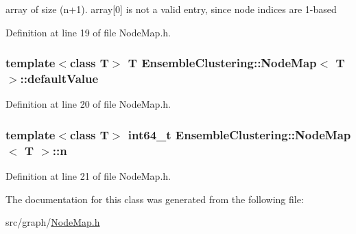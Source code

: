 array of size (n+1). array\mbox{[}0\mbox{]} is not a valid entry, since node indices are 1-\/based 



Definition at line 19 of file Node\-Map.\-h.

\hypertarget{class_ensemble_clustering_1_1_node_map_a79da6a77072605a77c060bbb2e5a620c}{
\subsubsection[{default\-Value}]{\setlength{\rightskip}{0pt plus 5cm}template$<$class T$>$ T {\bf Ensemble\-Clustering\-::\-Node\-Map}$<$ T $>$\-::default\-Value\hspace{0.3cm}{\ttfamily [protected]}}}\label{class_ensemble_clustering_1_1_node_map_a79da6a77072605a77c060bbb2e5a620c}


Definition at line 20 of file Node\-Map.\-h.

\hypertarget{class_ensemble_clustering_1_1_node_map_a511baf014428ed1dece45d9ab94f205b}{
\subsubsection[{n}]{\setlength{\rightskip}{0pt plus 5cm}template$<$class T$>$ int64\-\_\-t {\bf Ensemble\-Clustering\-::\-Node\-Map}$<$ T $>$\-::n\hspace{0.3cm}{\ttfamily [protected]}}}\label{class_ensemble_clustering_1_1_node_map_a511baf014428ed1dece45d9ab94f205b}


Definition at line 21 of file Node\-Map.\-h.



The documentation for this class was generated from the following file\-:\begin{DoxyCompactItemize}
\item 
src/graph/\hyperlink{_node_map_8h}{Node\-Map.\-h}\end{DoxyCompactItemize}
